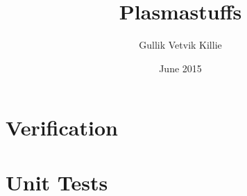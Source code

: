 \documentclass[x11names,twoside,english]{uiofysmaster}
\author{Gullik Vetvik Killie}
\title{Plasmastuffs}
\date{June 2015}
\begin{document}
% 

%
% 
%
% 
\chapter{Verification}
% 



% 
%
% 
%
% 
%
%
% 
% 
% 
% 


\chapter{Unit Tests}

%
% 
% 
% 

%
\end{document}
